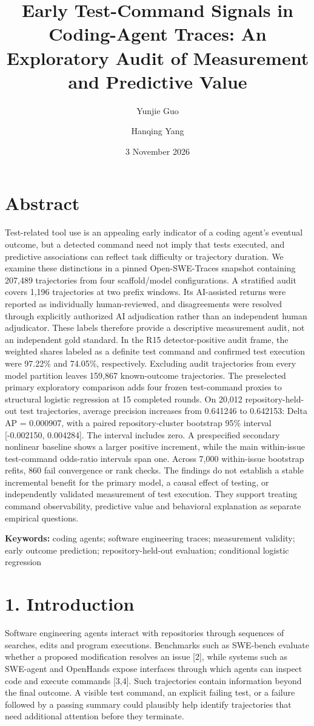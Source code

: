 \documentclass[10pt,a4paper]{article}
\title{Early Test-Command Signals in Coding-Agent Traces: An Exploratory Audit of Measurement and Predictive Value}
\author{Yunjie Guo \and Hanqing Yang}
\date{3 November 2026}
\begin{document}
\maketitle
\section{Abstract}
Test-related tool use is an appealing early indicator of a coding agent's eventual outcome, but a detected command need not imply that tests executed, and predictive associations can reflect task difficulty or trajectory duration. We examine these distinctions in a pinned Open-SWE-Traces snapshot containing 207,489 trajectories from four scaffold/model configurations. A stratified audit covers 1,196 trajectories at two prefix windows. Its AI-assisted returns were reported as individually human-reviewed, and disagreements were resolved through explicitly authorized AI adjudication rather than an independent human adjudicator. These labels therefore provide a descriptive measurement audit, not an independent gold standard. In the R15 detector-positive audit frame, the weighted shares labeled as a definite test command and confirmed test execution were 97.22\% and 74.05\%, respectively. Excluding audit trajectories from every model partition leaves 159,867 known-outcome trajectories. The preselected primary exploratory comparison adds four frozen test-command proxies to structural logistic regression at 15 completed rounds. On 20,012 repository-held-out test trajectories, average precision increases from 0.641246 to 0.642153: Delta AP = 0.000907, with a paired repository-cluster bootstrap 95\% interval [-0.002150, 0.004284]. The interval includes zero. A prespecified secondary nonlinear baseline shows a larger positive increment, while the main within-issue test-command odds-ratio intervals span one. Across 7,000 within-issue bootstrap refits, 860 fail convergence or rank checks. The findings do not establish a stable incremental benefit for the primary model, a causal effect of testing, or independently validated measurement of test execution. They support treating command observability, predictive value and behavioral explanation as separate empirical questions.

\textbf{Keywords:} coding agents; software engineering traces; measurement validity; early outcome prediction; repository-held-out evaluation; conditional logistic regression

\section{1. Introduction}
Software engineering agents interact with repositories through sequences of searches, edits and program executions. Benchmarks such as SWE-bench evaluate whether a proposed modification resolves an issue [2], while systems such as SWE-agent and OpenHands expose interfaces through which agents can inspect code and execute commands [3,4]. Such trajectories contain information beyond the final outcome. A visible test command, an explicit failing test, or a failure followed by a passing summary could plausibly help identify trajectories that need additional attention before they terminate.
\end{document}
